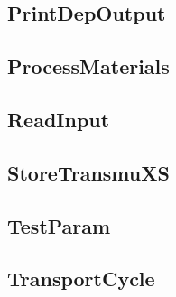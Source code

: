 \subsection{PrintDepOutput}


\subsection{ProcessMaterials}


\subsection{ReadInput}


\subsection{StoreTransmuXS}


\subsection{TestParam}


\subsection{TransportCycle}

